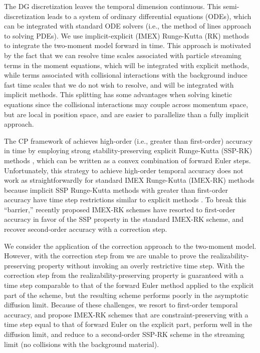 The DG discretization leaves the temporal dimension continuous.  
This semi-discretization leads to a system of ordinary differential equations (ODEs), which can be integrated with standard ODE solvers (i.e., the method of lines approach to solving PDEs).  
We use implicit-explicit (IMEX) Runge-Kutta (RK) methods \cite{ascher_etal_1997,pareschiRusso_2005} to integrate the two-moment model forward in time.  
This approach is motivated by the fact that we can resolve time scales associated with particle streaming terms in the moment equations, which will be integrated with explicit methods, while terms associated with collisional interactions with the background induce fast time scales that we do not wish to resolve, and will be integrated with implicit methods.  
This splitting has some advantages when solving kinetic equations since the collisional interactions may couple across momentum space, but are local in position space, and are easier to parallelize than a fully implicit approach.  

The CP framework of \cite{zhangShu_2010a} achieves high-order (i.e., greater than first-order) accuracy in time by employing strong stability-preserving explicit Runge-Kutta (SSP-RK) methods \cite{shuOsher_1988,gottlieb_etal_2001}, which can be written as a convex combination of forward Euler steps.  
Unfortunately, this strategy to achieve high-order temporal accuracy does not work as straightforwardly for standard IMEX Runge-Kutta (IMEX-RK) methods because implicit SSP Runge-Kutta methods with greater than first-order accuracy have time step restrictions similar to explicit methods \cite{gottlieb_etal_2001}.  
To break this ``barrier,'' recently proposed IMEX-RK schemes \cite{chertock_etal_2015,hu_etal_2018} have resorted to first-order accuracy in favor of the SSP property in the standard IMEX-RK scheme, and recover second-order accuracy with a correction step.  

We consider the application of the correction approach to the two-moment model.  
However, with the correction step from \cite{chertock_etal_2015} we are unable to prove the realizability-preserving property without invoking an overly restrictive time step.  
With the correction step from \cite{hu_etal_2018} the realizability-preserving property is guaranteed with a time step comparable to that of the forward Euler method applied to the explicit part of the scheme, but the resulting scheme performs poorly in the asymptotic diffusion limit.  
Because of these challenges, we resort to first-order temporal accuracy, and propose IMEX-RK schemes that are constraint-preserving with a time step equal to that of forward Euler on the explicit part, perform well in the diffusion limit, and reduce to a second-order SSP-RK scheme in the streaming limit (no collisions with the background material).  

